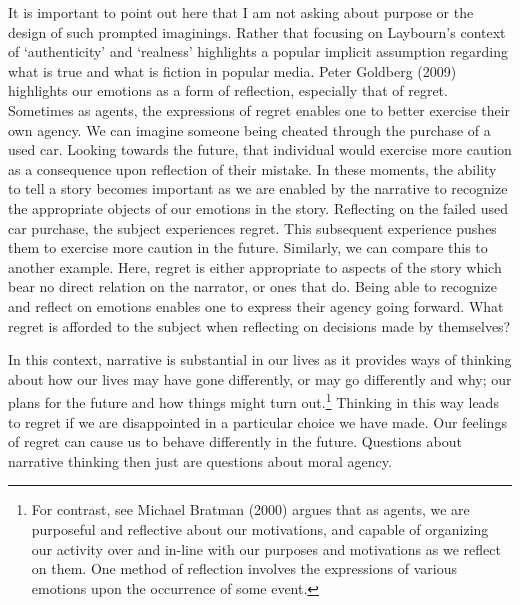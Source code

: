\documentclass[
  letterpaper,
  DIV=11,
  numbers=noendperiod]{scrreprt}
\begin{document}
\begin{tcolorbox}[enhanced jigsaw, arc=.35mm, breakable, rightrule=.15mm, colback=white, colframe=quarto-callout-important-color-frame, bottomrule=.15mm, leftrule=.75mm, opacityback=0, toprule=.15mm, left=2mm]
\begin{tcolorbox}[enhanced jigsaw, arc=.35mm, breakable, rightrule=.15mm, colback=white, colframe=quarto-callout-tip-color-frame, bottomrule=.15mm, leftrule=.75mm, opacityback=0, toprule=.15mm, left=2mm]
It is important to point out here that I am not asking about purpose or
the design of such prompted imaginings. Rather that focusing on
Laybourn's context of `authenticity' and `realness' highlights a popular
implicit assumption regarding what is true and what is fiction in
popular media. Peter Goldberg (2009) highlights our emotions as a form
of reflection, especially that of regret. Sometimes as agents, the
expressions of regret enables one to better exercise their own agency.
We can imagine someone being cheated through the purchase of a used car.
Looking towards the future, that individual would exercise more caution
as a consequence upon reflection of their mistake. In these moments, the
ability to tell a story becomes important as we are enabled by the
narrative to recognize the appropriate objects of our emotions in the
story. Reflecting on the failed used car purchase, the subject
experiences regret. This subsequent experience pushes them to exercise
more caution in the future. Similarly, we can compare this to another
example. Here, regret is either appropriate to aspects of the story
which bear no direct relation on the narrator, or ones that do. Being
able to recognize and reflect on emotions enables one to express their
agency going forward. What regret is afforded to the subject when
reflecting on decisions made by themselves?

In this context, narrative is substantial in our lives as it provides
ways of thinking about how our lives may have gone differently, or may
go differently and why; our plans for the future and how things might
turn out.\footnote{For contrast, see Michael Bratman (2000) argues that
  as agents, we are purposeful and reflective about our motivations, and
  capable of organizing our activity over and in-line with our purposes
  and motivations as we reflect on them. One method of reflection
  involves the expressions of various emotions upon the occurrence of
  some event.} Thinking in this way leads to regret if we are
disappointed in a particular choice we have made. Our feelings of regret
can cause us to behave differently in the future. Questions about
narrative thinking then just are questions about moral agency.


\end{tcolorbox}
\end{tcolorbox}
\end{document}
